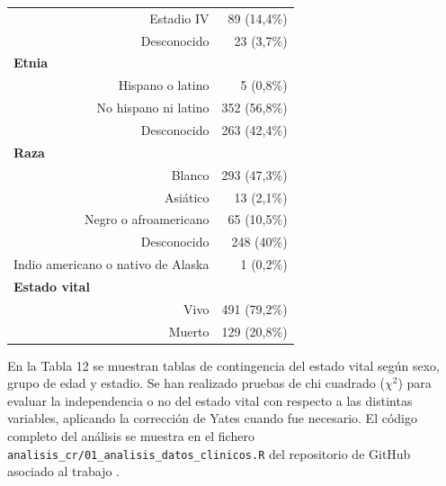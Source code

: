 \begin{table}[H]
\begin{tabular}{rr}
		Estadio IV                                 & 89 (14,4\%)                                               \\
		Desconocido                                & 23 (3,7\%)                                                \\ \hline
		\multicolumn{1}{l}{\textbf{Etnia}}         &                                                           \\
		Hispano o latino                           & 5 (0,8\%)                                                 \\
		No hispano ni latino                       & 352 (56,8\%)                                              \\
		Desconocido                                & 263 (42,4\%)                                              \\ \hline
		\multicolumn{1}{l}{\textbf{Raza}}          &                                                           \\
		Blanco                                     & 293 (47,3\%)                                              \\
		Asiático                                   & 13 (2,1\%)                                                \\
		Negro o afroamericano                      & 65 (10,5\%)                                               \\
		Desconocido                                & 248 (40\%)                                                \\
		Indio americano o nativo de Alaska         & 1 (0,2\%)                                                 \\ \hline
		\multicolumn{1}{l}{\textbf{Estado vital}}  &                                                           \\
		Vivo                                       & 491 (79,2\%)                                              \\
		Muerto                                     & 129 (20,8\%)                                              \\ \hline
	\end{tabular}
\end{table}

En la Tabla 12 se muestran tablas de contingencia del estado vital según sexo, grupo de edad y estadio. Se han realizado pruebas de chi cuadrado ($\chi^2$) \cite{Pearson1900} para evaluar la independencia o no del estado vital con respecto a las distintas variables, aplicando la corrección de Yates \cite{Yates1934} cuando fue necesario. El código completo del análisis se muestra en el fichero \texttt{analisis\_cr/01\_analisis\_datos\_clinicos.R} del repositorio de GitHub asociado al trabajo \cite{Redondo-Sanchez2020}.\\

